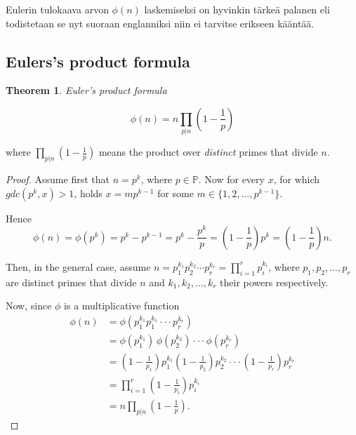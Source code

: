 \documentclass{article}
\theoremstyle{definition}
\newtheorem{theorem}[subsection]{Theorem}
\begin{document}
Eulerin tulokaava arvon $\phi(n)$ laskemiseksi on hyvinkin tärkeä palanen eli todistetaan se nyt suoraan englanniksi niin ei tarvitse erikseen kääntää.

\subsection{Eulers's product formula}

\begin{theorem}{\emph{Euler's product formula}}

\begin{equation*}
    \phi(n) = n \prod_{p \vert n} \left(1 - \frac{1}{p}\right)
\end{equation*}

where $\prod_{p \vert n} (1 - \frac{1}{p})$ means the product over \emph{distinct} primes that divide $n$.

\begin{proof}

Assume first that $n = p^k$, where $p\in \mathbb{P}$. Now for every $x$, for which $gdc(p^k,x)>1$, holds $x=mp^{k-1}$ for some $m\in \{1,2,...,p^{k-1}\}$.


Hence
\begin{equation*}
    \phi(n)=\phi(p^k)=p^k-p^{k-1}=p^k-\frac{p^k}{p}=\left(1-\frac{1}{p}\right)p^k=\left(1-\frac{1}{p}\right)n.
\end{equation*}

Then, in the general case, assume $n=p_1^{k_1} p_2^{k_2} \cdots p_r^{k_r}=\prod_{i=1}^r p_i^{k_i}$, where $p_1,p_2,...,p_r$ are distinct primes that divide $n$ and $k_1,k_2,...,k_r$ their powers respectively. 


Now, since $\phi$ is a multiplicative function
\begin{align*}
    \phi(n) & = \phi(p_1^{k_1} p_1^{k_1} \cdot \cdot \cdot p_r^{k_r})\\
    & = \phi(p_1^{k_1})\,\phi(p_2^{k_2}) \cdot \cdot \cdot \phi(p_r^{k_r})\\
    & = \left(1-\frac{1}{p_1}\right)p_1^{k_1} \left(1-\frac{1}{p_2}\right)p_2^{k_2} \cdot \cdot \cdot \left(1-\frac{1}{p_r}\right)p_r^{k_r}\\
    & = \prod_{i=1}^r \left(1-\frac{1}{p_i}\right) p_i^{k_i}\\
    & = n \prod_{p \vert n} \left(1 - \frac{1}{p}\right).
\end{align*}

\end{proof}

\end{theorem}
\end{document}
